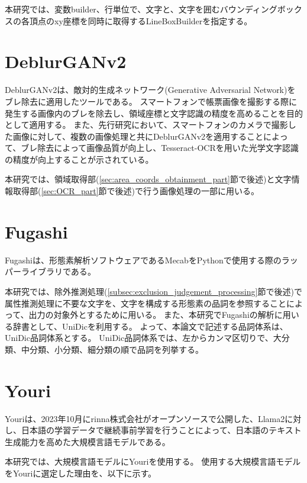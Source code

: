 本研究では、変数builder、行単位で、文字と、文字を囲むバウンディングボックスの各頂点のxy座標を同時に取得するLineBoxBuilderを指定する。

\section{DeblurGANv2}\label{sec:DeblurGANv2}
DeblurGANv2は、敵対的生成ネットワーク(Generative Adversarial Network)をブレ除去に適用したツールである\cite{DeblurGANv2}。
スマートフォンで帳票画像を撮影する際に発生する画像内のブレを除去し、領域座標と文字認識の精度を高めることを目的として適用する。
また、先行研究において、スマートフォンのカメラで撮影した画像に対して、複数の画像処理と共にDeblurGANv2を適用することによって、ブレ除去によって画像品質が向上し、Tesseract-OCRを用いた光学文字認識の精度が向上することが示されている\cite{DeblurGANv2の先行研究}。

本研究では、領域取得部(\ref{sec:area_coords_obtainment_part}節で後述)と文字情報取得部(\ref{sec:OCR_part}節で後述)で行う画像処理の一部に用いる。

\section{Fugashi}\label{sec:Fugashi}
Fugashiは、形態素解析ソフトウェアであるMecab\cite{Mecab}をPythonで使用する際のラッパーライブラリである\cite{Fugashi}。

本研究では、除外推測処理(\ref{subsec:exclusion_judgement_processing}節で後述)で属性推測処理に不要な文字を、文字を構成する形態素の品詞を参照することによって、出力の対象外とするために用いる。
また、本研究でFugashiの解析に用いる辞書として、UniDic\cite{UniDic}を利用する。
よって、本論文で記述する品詞体系は、UniDic品詞体系とする。
UniDic品詞体系では、左からカンマ区切りで、大分類、中分類、小分類、細分類の順で品詞を列挙する\cite{UniDic品詞体系}。

\section{Youri}\label{sec:Youri}
Youriは、2023年10月にrinna株式会社\cite{rinna}がオープンソースで公開した、Llama2\cite{Llama2}に対し、日本語の学習データで継続事前学習を行うことによって、日本語のテキスト生成能力を高めた大規模言語モデルである\cite{Youri}。

本研究では、大規模言語モデルにYouriを使用する。
使用する大規模言語モデルをYouriに選定した理由を、以下に示す。

